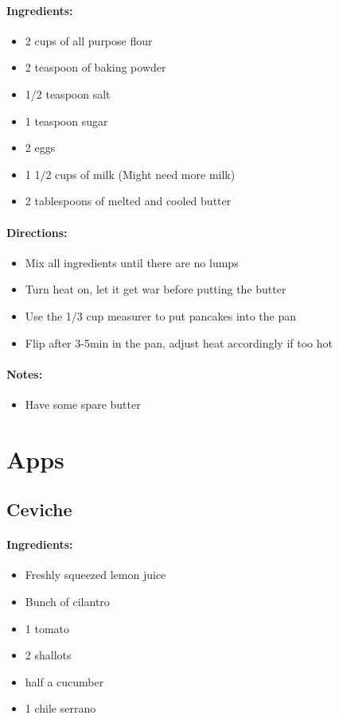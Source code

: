 \documentclass{article}
\begin{document}
\paragraph{Ingredients:}
\begin{itemize}
    \item 2 cups of all purpose flour
    \item 2 teaspoon of baking powder
    \item 1/2 teaspoon salt
    \item 1 teaspoon sugar
    \item 2 eggs
    \item 1 1/2 cups of milk (Might need more milk)
    \item 2 tablespoons of melted and cooled butter
\end{itemize}

\paragraph{Directions:}
\begin{itemize}
    \item Mix all ingredients until there are no lumps
    \item Turn heat on, let it get war before putting the butter
    \item Use the 1/3 cup measurer to put pancakes into the pan
    \item Flip after 3-5min in the pan, adjust heat accordingly if too hot
\end{itemize}

\paragraph{Notes:}
\begin{itemize}
    \item Have some spare butter
\end{itemize}

\section{Apps}


\subsection{Ceviche}

\paragraph{Ingredients:}
\begin{itemize}
    \item Freshly squeezed lemon juice
    \item Bunch of cilantro
    \item 1 tomato
    \item 2 shallots
    \item half a cucumber
    \item 1 chile serrano
\end{itemize}
\end{document}
